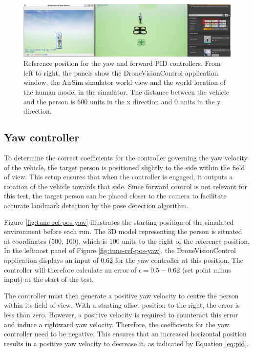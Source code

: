\begin{figure}[H]
  \centering
  \includegraphics[width=\textwidth, keepaspectratio]{img/pid/tune-ref-pos.jpg}
  \caption{Reference position for the yaw and forward PID controllers. From left to right, the panels show the DroneVisionControl application window, the AirSim simulator world view and the world location of the human model in the simulator. The distance between the vehicle and the person is 600 units in the x direction and 0 units in the y direction.}
  \label{fig:tune-start-pos}
\end{figure}


\subsection{Yaw controller}

To determine the correct coefficients for the controller governing the yaw velocity of the vehicle, the target person is positioned slightly to the side within the field of view. This setup ensures that when the controller is engaged, it outputs a rotation of the vehicle towards that side. Since forward control is not relevant for this test, the target person can be placed closer to the camera to facilitate accurate landmark detection by the pose detection algorithm.

Figure \ref{fig:tune-ref-pos-yaw} illustrates the starting position of the simulated environment before each run. The 3D model representing the person is situated at coordinates (500, 100), which is 100 units to the right of the reference position. In the leftmost panel of Figure \ref{fig:tune-ref-pos-yaw}, the DroneVisionControl application displays an input of 0.62 for the yaw controller at this position. The controller will therefore calculate an error of $\epsilon = 0.5 - 0.62$ (set point minus input) at the start of the test.

The controller must then generate a positive yaw velocity to centre the person within its field of view. With a starting offset position to the right, the error is less than zero. However, a positive velocity is required to counteract this error and induce a rightward yaw velocity. Therefore, the coefficients for the yaw controller need to be negative. This ensures that an increased horizontal position results in a positive yaw velocity to decrease it, as indicated by Equation \ref{eq:pid}.


